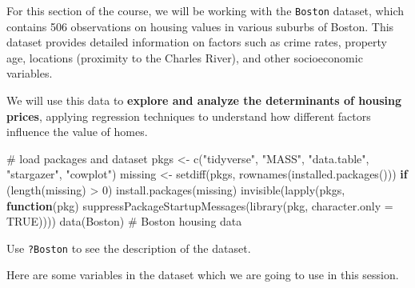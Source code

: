 \documentclass[
  12pt,
  a4paper,
]{scrbook}
\newenvironment{Shaded}{\begin{snugshade}}{\end{snugshade}}
\newcommand{\AttributeTok}[1]{\textcolor[rgb]{0.40,0.45,0.13}{#1}}
\newcommand{\CommentTok}[1]{\textcolor[rgb]{0.37,0.37,0.37}{#1}}
\newcommand{\ConstantTok}[1]{\textcolor[rgb]{0.56,0.35,0.01}{#1}}
\newcommand{\ControlFlowTok}[1]{\textcolor[rgb]{0.00,0.23,0.31}{\textbf{#1}}}
\newcommand{\DecValTok}[1]{\textcolor[rgb]{0.68,0.00,0.00}{#1}}
\newcommand{\FunctionTok}[1]{\textcolor[rgb]{0.28,0.35,0.67}{#1}}
\newcommand{\NormalTok}[1]{\textcolor[rgb]{0.00,0.23,0.31}{#1}}
\newcommand{\OtherTok}[1]{\textcolor[rgb]{0.00,0.23,0.31}{#1}}
\newcommand{\SpecialCharTok}[1]{\textcolor[rgb]{0.37,0.37,0.37}{#1}}
\newcommand{\StringTok}[1]{\textcolor[rgb]{0.13,0.47,0.30}{#1}}
\theoremstyle{plain}
\theoremstyle{definition}
\theoremstyle{remark}
\begin{document}
For this section of the course, we will be working with the
\texttt{Boston} dataset, which contains 506 observations on housing
values in various suburbs of Boston. This dataset provides detailed
information on factors such as crime rates, property age, locations
(proximity to the Charles River), and other socioeconomic variables.

We will use this data to \textbf{explore and analyze the determinants of
housing prices}, applying regression techniques to understand how
different factors influence the value of homes.

\begin{Shaded}
\begin{Highlighting}[]
\CommentTok{\# load packages and dataset}
\NormalTok{pkgs }\OtherTok{\textless{}{-}} \FunctionTok{c}\NormalTok{(}\StringTok{"tidyverse"}\NormalTok{, }\StringTok{"MASS"}\NormalTok{, }\StringTok{"data.table"}\NormalTok{, }\StringTok{"stargazer"}\NormalTok{, }\StringTok{"cowplot"}\NormalTok{)}
\NormalTok{missing }\OtherTok{\textless{}{-}} \FunctionTok{setdiff}\NormalTok{(pkgs, }\FunctionTok{rownames}\NormalTok{(}\FunctionTok{installed.packages}\NormalTok{()))}
\ControlFlowTok{if}\NormalTok{ (}\FunctionTok{length}\NormalTok{(missing) }\SpecialCharTok{\textgreater{}} \DecValTok{0}\NormalTok{) }\FunctionTok{install.packages}\NormalTok{(missing)}
\FunctionTok{invisible}\NormalTok{(}\FunctionTok{lapply}\NormalTok{(pkgs, }\ControlFlowTok{function}\NormalTok{(pkg) }\FunctionTok{suppressPackageStartupMessages}\NormalTok{(}\FunctionTok{library}\NormalTok{(pkg, }\AttributeTok{character.only =} \ConstantTok{TRUE}\NormalTok{))))}
\FunctionTok{data}\NormalTok{(Boston) }\CommentTok{\# Boston housing data}
\end{Highlighting}
\end{Shaded}

Use \texttt{?Boston} to see the description of the dataset.

Here are some variables in the dataset which we are going to use in this
session.

\end{document}
